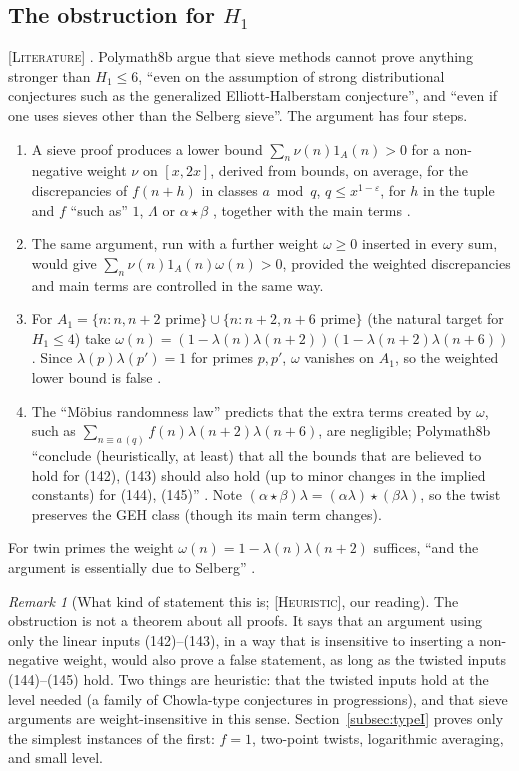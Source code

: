 \documentclass[11pt]{amsart}
\theoremstyle{definition}
\theoremstyle{remark}
\newtheorem{remark}[theorem]{Remark}
\newcommand{\lbl}[1]{\textup{\textsc{[#1]}}}
\begin{document}
\subsection{The obstruction for \texorpdfstring{$H_1$}{H1}}
\lbl{Literature} \cite[\S8, pp.~68--71]{PM8b}. Polymath8b argue that sieve
methods cannot prove anything stronger than $H_1\le 6$, ``even on the
assumption of strong distributional conjectures such as the generalized
Elliott-Halberstam conjecture'', and ``even if one uses sieves other than the
Selberg sieve''. The argument has four steps.
\begin{enumerate}
\item A sieve proof produces a lower bound $\sum_n \nu(n)1_A(n)>0$ for a
  non-negative weight $\nu$ on $[x,2x]$, derived from bounds, on average, for
  the discrepancies of $f(n+h)$ in classes $a\bmod q$, $q\le x^{1-\varepsilon}$,
  for $h$ in the tuple and $f$ ``such as'' $1$, $\Lambda$ or $\alpha\star\beta$
  \cite[(142)]{PM8b}, together with the main terms \cite[(143)]{PM8b}.
\item The same argument, run with a further weight $\omega\ge0$ inserted in
  every sum, would give $\sum_n\nu(n)1_A(n)\omega(n)>0$, provided the weighted
  discrepancies and main terms \cite[(144)--(145)]{PM8b} are controlled in
  the same way.
\item For $A_1=\{n: n,n+2\text{ prime}\}\cup\{n:n+2,n+6\text{ prime}\}$ (the
  natural target for $H_1\le 4$) take
  $\omega(n)=(1-\lambda(n)\lambda(n+2))(1-\lambda(n+2)\lambda(n+6))$. Since
  $\lambda(p)\lambda(p')=1$ for primes $p,p'$, $\omega$ vanishes on $A_1$, so
  the weighted lower bound is false \cite[(148)]{PM8b}.
\item The ``M\"obius randomness law'' predicts that the extra terms created by
  $\omega$, such as $\sum_{n\equiv a\,(q)} f(n)\lambda(n+2)\lambda(n+6)$, are
  negligible; Polymath8b ``conclude (heuristically, at least) that all the
  bounds that are believed to hold for (142), (143) should also hold (up to
  minor changes in the implied constants) for (144), (145)''
  \cite[p.~70]{PM8b}. Note $(\alpha\star\beta)\lambda=(\alpha\lambda)\star
  (\beta\lambda)$, so the twist preserves the GEH class (though its main
  term changes).
\end{enumerate}
For twin primes the weight $\omega(n)=1-\lambda(n)\lambda(n+2)$ suffices,
``and the argument is essentially due to Selberg'' \cite[p.~70]{PM8b}.

\begin{remark}[What kind of statement this is; \lbl{Heuristic}, our reading]\label{rem:meta}
The obstruction is not a theorem about all proofs. It says that an argument
using only the linear inputs (142)--(143), in a way that is insensitive to
inserting a non-negative weight, would also prove a false statement, as long
as the twisted inputs (144)--(145) hold. Two things are heuristic: that the
twisted inputs hold at the level needed (a family of Chowla-type conjectures
in progressions), and that sieve arguments are weight-insensitive in this
sense. Section~\ref{subsec:typeI} proves only the simplest instances of the
first: $f=1$, two-point twists, logarithmic averaging, and small level.
\end{remark}
\end{document}
